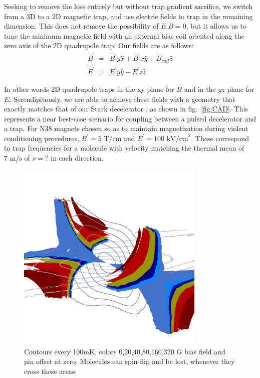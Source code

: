 \documentclass[%
 reprint,
 amsmath,amssymb,
 aps,
prl,
]{revtex4-1}
\begin{document}
Seeking to remove the loss entirely but without trap gradient sacrifice, we switch from a 3D to a 2D magnetic trap, and use electric fields to trap in the remaining dimension. This does not remove the possibility of $E.B=0$, but it allows us to tune the minimum magnetic field with an external bias coil oriented along the zero axis of the 2D quadrupole trap.  Our fields are as follows:
\begin{eqnarray}
\vec{B} &=&  B^\prime y\hat{x}+ B^\prime x\hat{y} + B_{coil} \hat{z}\\
\vec{E} &=&  E^\prime y\hat{y}-  E^\prime z\hat{z}
\end{eqnarray}

\noindent In other words 2D quadrupole traps in the xy plane for $B$ and in the $yz$ plane for $E$. Serendipitously, we are able to achieve these fields with a geometry that exactly matches that of our Stark decelerator \cite{Bochinnski2003}, as shown in fig.~\ref{fig:CAD}. This represents a near best-case scenario for coupling between a pulsed decelerator and a trap. For N38 magnets chosen so as to maintain magnetization during violent conditioning procedures, $B^\prime=5\text{ T/cm}$ and $E^\prime=100 \text{ kV/cm}^2$. These correspond to trap frequencies for a molecule with velocity matching the thermal mean of $7 \text{ m/s}$ of $\nu=?$ in each direction.

\begin{figure}
\includegraphics[width=90mm]{Loss_Surface_Chunks_recolored.png}%
\caption{
Contours every 100mK, colors 0,20,40,80,160,320 G bias field and pin offset at zero. Molecules can spin-flip and be lost, whenever they cross these areas.
\label{fig:LSurfs}}
\end{figure}
\end{document}
